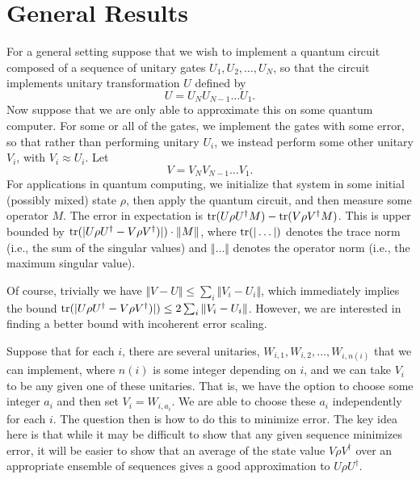 \documentclass[aps,prl,amsmath,amssymb,amsfonts,superscriptaddress,floatfix]{revtex4}
\newcommand{\tr}{{\rm tr}}
\newcommand{\be}{\begin{equation}}
\newcommand{\ee}{\end{equation}}
\begin{document}
\section{General Results}
For a general setting
suppose that we wish to implement a quantum circuit composed of a sequence of unitary gates $U_1, U_2, \ldots, U_N$, so
that
the circuit implements unitary transformation $U$ defined by
\be
\label{Udef}
U=U_N U_{N-1} \ldots U_1.
\ee
Now suppose that we are only able to approximate this on some quantum computer.
For some or all of the gates, we implement the gates with some error, so that rather than
performing unitary $U_i$, we instead perform some other unitary $V_i$, with $V_i \approx U_i$.  
Let
\be
\label{Vdef}
V=V_N V_{N-1} \ldots V_1.
\ee
For applications in quantum computing, we initialize that system in some initial (possibly mixed) state $\rho$, then apply the quantum circuit, and then measure some operator $M$.  
The error in expectation is ${\rm tr}(U\rho U^\dagger M)-{\rm tr}(V \rho V^\dagger M)$.  This is upper bounded by
$\tr(|U\rho U^\dagger - V\rho V^\dagger)|) \cdot \Vert M \Vert$, where $\tr(|\ldots |)$ denotes the trace norm (i.e., the sum of the singular values) and $\Vert \ldots \Vert$ denotes the operator norm (i.e., the maximum singular value).



Of course, trivially we have $\Vert V-U \Vert \leq \sum_i \Vert V_i - U_i \Vert$, which immediately implies the bound
$\tr(|U\rho U^\dagger - V\rho V^\dagger)|) \leq  2 \sum_i \Vert V_i - U_i \Vert$.  
However, we are interested in finding a better bound with incoherent error scaling.

Suppose that for each $i$, there are several unitaries, $W_{i,1},W_{i,2}, \ldots, W_{i,n(i)}$ that we can implement,
where $n(i)$ is some integer depending on $i$,  and we can take $V_i$ to be any given one of these unitaries.  That is, we have the option to choose some integer $a_i$ and then set $V_i=W_{i,a_i}$.  We are able to choose these $a_i$ independently for each $i$.  The question then is how to do this to minimize error.
The key idea here is that while it may be difficult to show that any given sequence minimizes error, it will be
easier to show that an average of the state value $V \rho V^\dagger$
over an appropriate ensemble of sequences gives a good approximation to $U \rho U^\dagger$.
\end{document}
